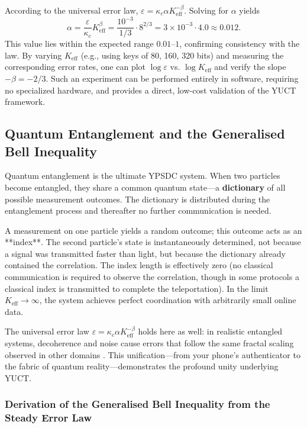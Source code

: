 \documentclass[12pt,a4paper]{article}
\theoremstyle{remark}
\newcommand{\Keff}{K_{\mathrm{eff}}}
\begin{document}
	According to the universal error law, $\varepsilon = \kappa_c \alpha K_{\mathrm{eff}}^{-\beta}$. Solving for $\alpha$ yields
	\[
	\alpha = \frac{\varepsilon}{\kappa_c} K_{\mathrm{eff}}^{\beta} = \frac{10^{-3}}{1/3} \cdot 8^{2/3} = 3 \times 10^{-3} \cdot 4.0 \approx 0.012.
	\]
	This value lies within the expected range $0.01$--$1$, confirming consistency with the law. By varying $\Keff$ (e.g., using keys of 80, 160, 320 bits) and measuring the corresponding error rates, one can plot $\log \varepsilon$ vs. $\log \Keff$ and verify the slope $-\beta = -2/3$. Such an experiment can be performed entirely in software, requiring no specialized hardware, and provides a direct, low-cost validation of the YUCT framework.
	
	\subsection{Quantum Entanglement and the Generalised Bell Inequality}
	
	Quantum entanglement is the ultimate YPSDC system. When two particles become entangled, they share a common quantum state---a \textbf{dictionary} of all possible measurement outcomes. The dictionary is distributed during the entanglement process and thereafter no further communication is needed.
	
	A measurement on one particle yields a random outcome; this outcome acts as an **index**. The second particle's state is instantaneously determined, not because a signal was transmitted faster than light, but because the dictionary already contained the correlation. The index length is effectively zero (no classical communication is required to observe the correlation, though in some protocols a classical index is transmitted to complete the teleportation). In the limit $\Keff \to \infty$, the system achieves perfect coordination with arbitrarily small online data.
	
	The universal error law $\varepsilon = \kappa_c \alpha K_{\mathrm{eff}}^{-\beta}$ holds here as well: in realistic entangled systems, decoherence and noise cause errors that follow the same fractal scaling observed in other domains \cite{AppendixG, AppendixS}. This unification---from your phone's authenticator to the fabric of quantum reality---demonstrates the profound unity underlying YUCT.
	
	\subsubsection{Derivation of the Generalised Bell Inequality from the Steady Error Law}
	\label{subsec:bell-derivation}
	
\end{document}
